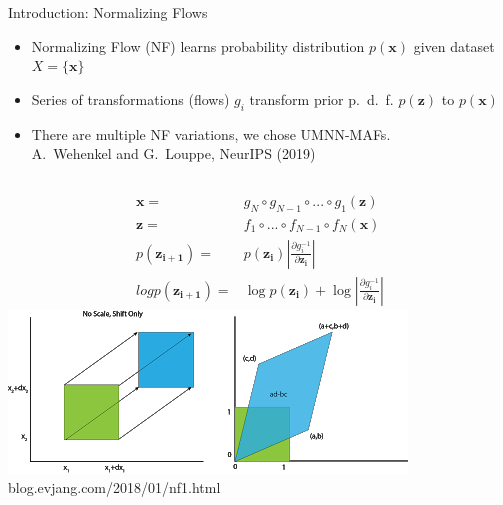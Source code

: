 \documentclass[aspectratio=169]{beamer}
\begin{document}
\begin{frame}{Introduction: Normalizing Flows}
    \begin{itemize}
        \item Normalizing Flow (NF) learns probability distribution $p(\mathbf{x})$ given dataset $X=\{\mathbf{x}\}$
        \item Series of transformations (flows) $g_i$ transform prior p.~d.~f. $p(\mathbf{z})$ to $p(\mathbf{x})$
        \item There are multiple NF variations, we chose UMNN-MAFs.\\
        \quad A.~Wehenkel and G.~Louppe, NeurIPS (2019)
    \end{itemize}

    \begin{columns}

        \begin{align}
        \mathbf{x} =& g_N \circ g_{N-1}\circ ... \circ g_1 (\mathbf{z}) \nonumber\\
        \mathbf{z} =& f_1 \circ ... \circ f_{N-1} \circ f_N (\mathbf{x}) \nonumber \label{eqn:invertible}\\
         p(\mathbf{z_{i+1}})=&p(\mathbf{z_i})|\frac{\partial g_{i}^{-1}}{\partial \mathbf{z_i}}| \nonumber\\
         log p(\mathbf{z_{i+1}}) =& \log p(\mathbf{z_i}) + \log|\frac{\partial g_i^{-1}}{\partial \mathbf{z_i}}| \nonumber
        \end{align}
        \vspace{0.1\textwidth}
        \includegraphics[width=\textwidth]{images/Misc/jacobian.png}
        blog.evjang.com/2018/01/nf1.html
    \end{columns}
    
\end{frame}
\end{document}
